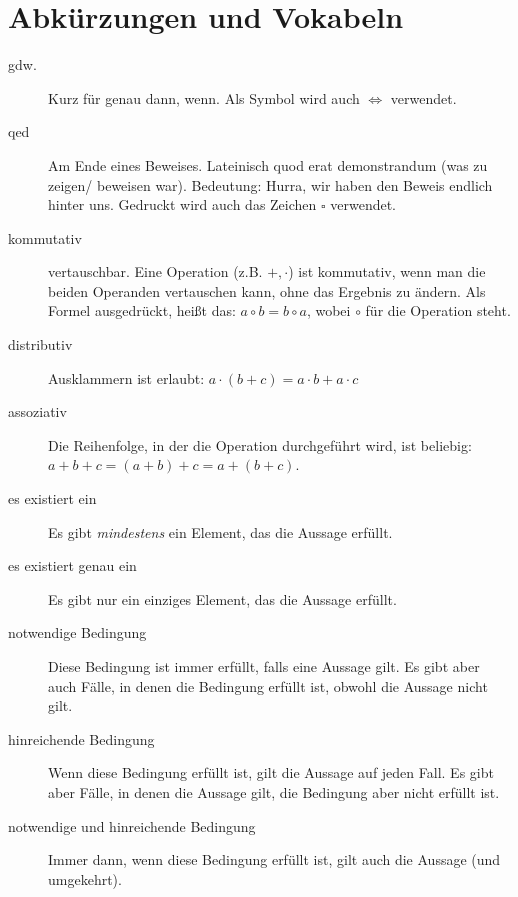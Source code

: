 \section{Abkürzungen und Vokabeln}
\begin{description}
 \item[gdw.] Kurz für \glqq genau dann, wenn\grqq. Als Symbol wird auch
$\Leftrightarrow$ verwendet.
 \item[qed] Am Ende eines Beweises. Lateinisch \glqq quod erat
demonstrandum\grqq{} (\glqq was zu zeigen/ beweisen war\grqq). Bedeutung:
Hurra, wir haben den Beweis endlich hinter uns. Gedruckt wird auch
das Zeichen $\square$ verwendet.
 \item[kommutativ] \glqq vertauschbar\grqq. Eine Operation (z.B. $+,\cdot$)
ist kommutativ, wenn man die beiden Operanden vertauschen kann, ohne das
Ergebnis zu ändern. Als Formel ausgedrückt, heißt das: $a\circ b = b\circ a$,
wobei $\circ$ für die Operation steht.
 \item[distributiv] Ausklammern ist erlaubt: $a\cdot(b+c) = a\cdot b + a\cdot
c$
 \item[assoziativ] Die Reihenfolge, in der die Operation durchgeführt wird,
ist beliebig: $a+b+c = (a+b)+c = a+(b+c)$.
 \item[es existiert ein] Es gibt \emph{mindestens} ein Element, das die
Aussage erfüllt.
 \item[es existiert genau ein] Es gibt nur ein einziges Element, das die
Aussage erfüllt.
 \item[notwendige Bedingung] Diese Bedingung ist immer erfüllt, falls eine Aussage gilt. Es gibt aber auch Fälle, in denen die Bedingung erfüllt ist, obwohl die Aussage nicht gilt.
 \item[hinreichende Bedingung] Wenn diese Bedingung erfüllt ist, gilt die Aussage auf jeden Fall. Es gibt aber Fälle, in denen die Aussage gilt, die Bedingung aber nicht erfüllt ist.
 \item[notwendige und hinreichende Bedingung] Immer dann, wenn diese Bedingung erfüllt ist, gilt auch die Aussage (und umgekehrt).
\end{description}




